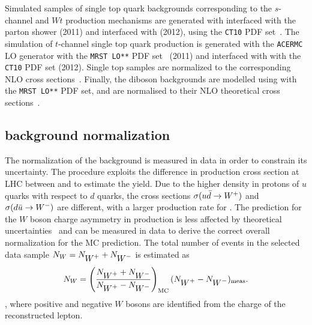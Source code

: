 Simulated samples of single top quark backgrounds corresponding to the
$s$-channel and $Wt$ production mechanisms are generated with \mcatnlo{}
interfaced with the \herwig{} parton shower (2011) and \powheg{}
interfaced with \pythia{} (2012), using the {\tt CT10} PDF set~\cite{ct10}.
The simulation of $t$-channel single top quark production is
generated with the {\tt ACERMC} LO generator with the {\tt MRST LO**}
PDF set~\cite{mrst}  (2011) and \powheg{} interfaced with \pythia{}
with the {\tt CT10} PDF set (2012). Single top samples are normalized
to the corresponding NLO cross sections~\cite{stschan,sttchan,stwt}.
Finally, the diboson backgrounds are modelled using \herwig{} with
the {\tt MRST LO**} PDF set, and are normalised to their NLO
theoretical cross sections~\cite{dibosonxs}.

\subsection{\wjets{} background normalization}
\label{sec:wjets}

The normalization of the \wjets{} background is measured in data in
order to constrain its uncertainty.
The procedure exploits the difference in production cross section at LHC
between \wpp{} and \wm{} to estimate the \wjets{} yield.
Due to the higher density in protons of $u$ quarks with respect to $d$ quarks,
the cross sections $\sigma(u\bar{d}\to \mbox{$W^+$}{})$ and $\sigma(d\bar{u}\to
\mbox{$W^-$}{})$ are different, with a larger production rate for \wpp{}. The
prediction for the $W$ boson charge asymmetry in \wjets{} production is less
affected by theoretical uncertainties~\cite{wasym} and can be measured
in data to derive the correct overall normalization for the MC prediction.
The total number of \wjets{} events in the selected data sample
$N_W=N_{\mbox{$W^+$}{}}+N_{\mbox{$W^-$}{}}$ is estimated as
\begin{equation}
N_W = \left(\frac{N_{\mbox{$W^+$}{}}+N_{\mbox{$W^-$}{}}}{N_{\mbox{$W^+$}{}}-N_{\mbox{$W^-$}{}}}\right )_{\rm MC}(N_{\mbox{$W^+$}{}}-N_{\mbox{$W^-$}{}})_{\rm meas}.
\label{eq:nw}
\end{equation}
, where positive and negative $W$ bosons are identified from the
charge of the reconstructed lepton. 

